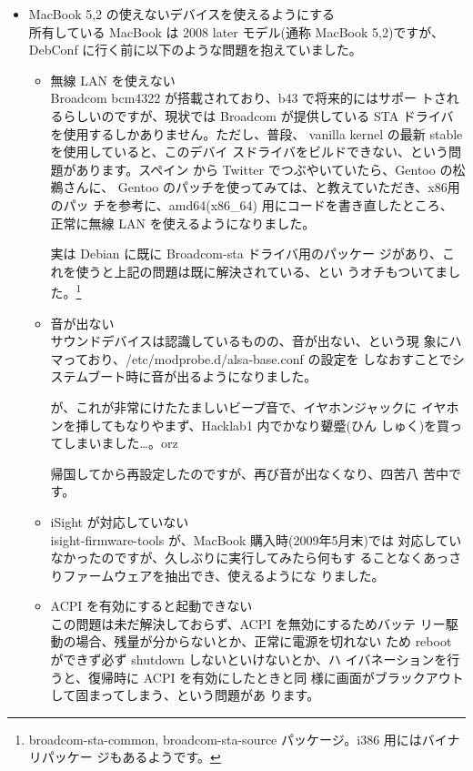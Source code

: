\documentclass[mingoth,a4paper]{jsarticle}
\begin{document}
\begin{itemize}
 \item MacBook 5,2 の使えないデバイスを使えるようにする\\
       所有している MacBook は 2008 later モデル(通称 MacBook 5,2)ですが、
       DebConf に行く前に以下のような問題を抱えていました。

       \begin{itemize}
	\item 無線 LAN を使えない \\
	      Broadcom bcm4322 が搭載されており、b43 で将来的にはサポー
	      トされるらしいのですが、現状では Broadcom が提供している
	      STA ドライバを使用するしかありません。ただし、普段、
	      vanilla kernel の最新 stable を使用していると、このデバイ
	      スドライバをビルドできない、という問題があります。スペイン
	      から Twitter でつぶやいていたら、Gentoo の松鵜さんに、
	      Gentoo のパッチを使ってみては、と教えていただき、x86用のパッ
	      チを参考に、amd64(x86\_64) 用にコードを書き直したところ、
	      正常に無線 LAN を使えるようになりました。

	      実は Debian に既に Broadcom-sta ドライバ用のパッケー
	      ジがあり、これを使うと上記の問題は既に解決されている、とい
	      うオチもついてました。\footnote{broadcom-sta-common,
	      broadcom-sta-source パッケージ。i386 用にはバイナリパッケー
	      ジもあるようです。}
	\item 音が出ない \\
	      サウンドデバイスは認識しているものの、音が出ない、という現
	      象にハマっており、/etc/modprobe.d/alsa-base.conf の設定を
	      しなおすことでシステムブート時に音が出るようになりました。

	      が、これが非常にけたたましいビープ音で、イヤホンジャックに
	      イヤホンを挿してもなりやまず、Hacklab1 内でかなり顰蹙(ひん
	      しゅく)を買ってしまいました…。orz

	      帰国してから再設定したのですが、再び音が出なくなり、四苦八
	      苦中です。
	\item iSight が対応していない \\
	      isight-firmware-tools が、MacBook 購入時(2009年5月末)では
	      対応していなかったのですが、久しぶりに実行してみたら何もす
	      ることなくあっさりファームウェアを抽出でき、使えるようにな
	      りました。
	\item ACPI を有効にすると起動できない \\
	      この問題は未だ解決しておらず、ACPI を無効にするためバッテ
	      リー駆動の場合、残量が分からないとか、正常に電源を切れない
	      ため reboot ができず必ず shutdown しないといけないとか、ハ
	      イバネーションを行うと、復帰時に ACPI を有効にしたときと同
	      様に画面がブラックアウトして固まってしまう、という問題があ
	      ります。
	      

\end{itemize}
\end{itemize}
\end{document}
